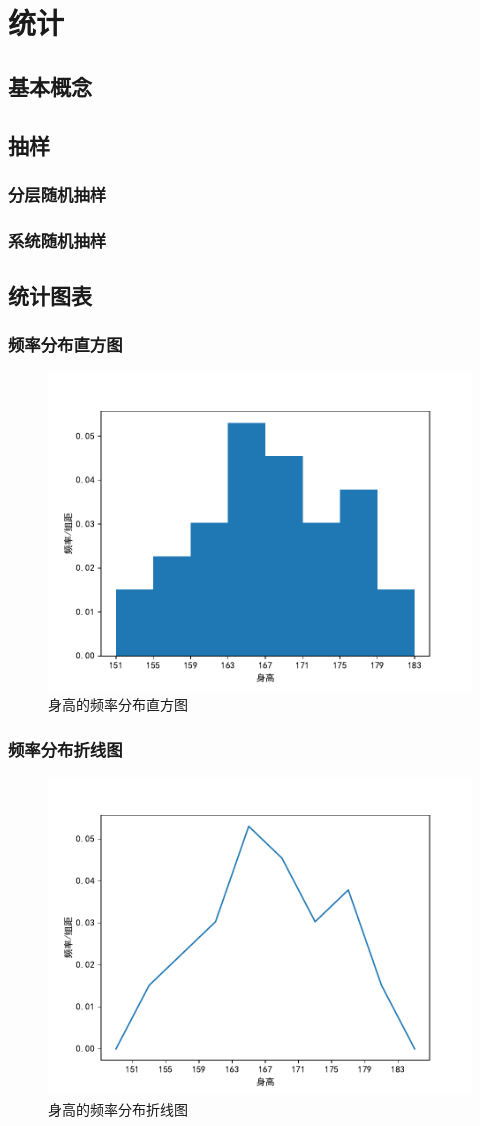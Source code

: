 \chapter{统计}

\section{基本概念}

\section{抽样}
\subsection{分层随机抽样}
\subsection{系统随机抽样}

\section{统计图表}
\subsection{频率分布直方图}
\begin{figure}[htb]
	\centering
	\includegraphics[width=0.6\linewidth]{src/images/chart1.pdf}
	\caption{身高的频率分布直方图}
	\label{fig:histogram}
\end{figure}

\subsection{频率分布折线图}
\begin{figure}[htb]
	\centering
	\includegraphics[width=0.6\linewidth]{src/images/chart2.pdf}
	\caption{身高的频率分布折线图}
	\label{fig:line-chart}
\end{figure}


